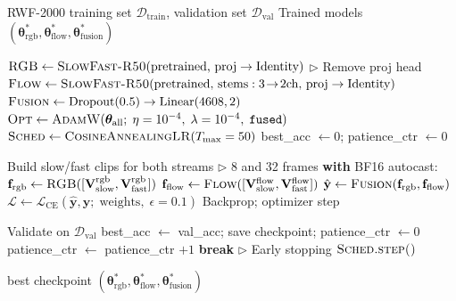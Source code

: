 \documentclass[11pt,a4paper]{article}
\begin{document}
\begin{algorithm}[H]
\caption{Dual SlowFast: Violence Detection Training}\label{alg:violence_train}
\begin{algorithmic}[1]
\Require RWF-2000 training set $\mathcal{D}_{\text{train}}$, validation set $\mathcal{D}_{\text{val}}$
\Ensure Trained models $(\boldsymbol{\theta}_{\text{rgb}}^*, \boldsymbol{\theta}_{\text{flow}}^*, \boldsymbol{\theta}_{\text{fusion}}^*)$

\State $\textsc{RGB} \gets \textsc{SlowFast-R50}(\text{pretrained, proj} \to \text{Identity})$  \hfill $\triangleright$ Remove proj head
\State $\textsc{Flow} \gets \textsc{SlowFast-R50}(\text{pretrained, stems}: 3\!\to\!2\text{ch, proj} \to \text{Identity})$
\State $\textsc{Fusion} \gets \text{Dropout}(0.5) \to \text{Linear}(4608, 2)$
\State $\textsc{Opt} \gets \textsc{AdamW}(\boldsymbol{\theta}_{\text{all}};\; \eta=10^{-4},\; \lambda=10^{-4},\; \texttt{fused})$
\State $\textsc{Sched} \gets \textsc{CosineAnnealingLR}(T_{\max}=50)$
\State best\_acc $\gets 0$; patience\_ctr $\gets 0$

        \State Build slow/fast clips for both streams \hfill $\triangleright$ 8 and 32 frames
        \State \textbf{with} BF16 autocast:
        \State \quad $\mathbf{f}_{\text{rgb}} \gets \textsc{RGB}([\mathbf{V}_{\text{slow}}^{\text{rgb}}, \mathbf{V}_{\text{fast}}^{\text{rgb}}])$
        \State \quad $\mathbf{f}_{\text{flow}} \gets \textsc{Flow}([\mathbf{V}_{\text{slow}}^{\text{flow}}, \mathbf{V}_{\text{fast}}^{\text{flow}}])$
        \State \quad $\hat{\mathbf{y}} \gets \textsc{Fusion}(\mathbf{f}_{\text{rgb}}, \mathbf{f}_{\text{flow}})$
        \State \quad $\mathcal{L} \gets \mathcal{L}_{\text{CE}}(\hat{\mathbf{y}}, \mathbf{y};\; \text{weights},\; \epsilon=0.1)$
        \State Backprop; optimizer step
    \EndFor

    \State Validate on $\mathcal{D}_{\text{val}}$
        \State best\_acc $\gets$ val\_acc; save checkpoint; patience\_ctr $\gets 0$
    \Else
        \State patience\_ctr $\gets$ patience\_ctr $+ 1$
         \textbf{break} \hfill $\triangleright$ Early stopping
        \EndIf
    \EndIf
    \State $\textsc{Sched.step()}$
\EndFor

\State \Return best checkpoint $(\boldsymbol{\theta}_{\text{rgb}}^*, \boldsymbol{\theta}_{\text{flow}}^*, \boldsymbol{\theta}_{\text{fusion}}^*)$
\end{algorithmic}
\end{algorithm}
\end{document}
